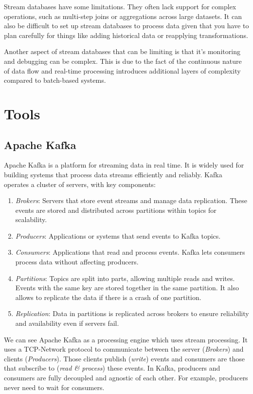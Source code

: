 \documentclass[utf8,9pt]{extarticle}
\begin{document}
Stream databases have some limitations. They often lack support for complex operations, such as multi-step joins or aggregations across large datasets. It can also be difficult to set up stream databases to process data given that you have to plan carefully for things like adding historical data or reapplying transformations.

Another aspect of stream databases that can be limiting is that it's monitoring and debugging can be complex. This is due to the fact of the continuous nature of data flow and real-time processing introduces additional layers of complexity compared to batch-based systems.


\section{Tools}
\subsection{Apache Kafka}
\hspace{2mm} Apache Kafka is a platform for streaming data in real time. It is widely used for building systems that process data streams efficiently and reliably. 
Kafka operates a cluster of servers, with key components:
\begin{enumerate}
    \item \textit{Brokers}: Servers that store event streams and manage data replication. These events are stored and distributed across partitions within topics for scalability.
    \item \textit{Producers}: Applications or systems that send events to Kafka topics.
    \item \textit{Consumers}: Applications that read and process events. Kafka lets consumers process data without affecting producers.
    \item \textit{Partitions}: Topics are split into parts, allowing multiple reads and writes. Events with the same key are stored together in the same partition. It also allows to replicate the data if there is a crash of one partition.
    \item \textit{Replication}: Data in partitions is replicated across brokers to ensure reliability and availability even if servers fail.
\end{enumerate}

We can see Apache Kafka as a processing engine which uses stream processing. It uses a TCP-Network protocol to communicate between the server (\textit{Brokers}) and clients (\textit{Producers}). Those clients publish (\textit{write}) events and consumers are those that subscribe to (\textit{read \& process}) these events. In Kafka, producers and consumers are fully decoupled and agnostic of each other. For example, producers never need to wait for consumers.
\end{document}
